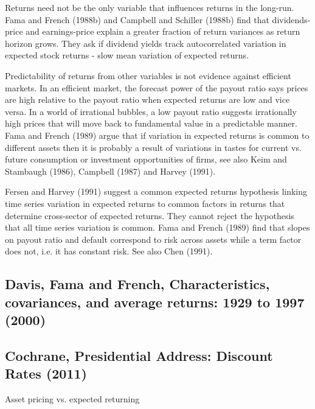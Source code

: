 Returns need not be the only variable that influences returns in the long-run. Fama and
French (1988b)\cite{fama1988dividend} and Campbell and Schiller
(1988b)\cite{campbell1988stock} find that dividends-price and earnings-price explain a
greater fraction of return variances as return horizon grows. They ask if dividend yields
track autocorrelated variation in expected stock returns - slow mean variation of expected
returns.

Predictability of returns from other variables is not evidence against efficient markets.
In an efficient market, the forecast power of the payout ratio says prices are high
relative to the payout ratio when expected returns are low and vice versa. In a world of
irrational bubbles, a low payout ratio suggests irrationally high prices that will move
back to fundamental value in a predictable manner. Fama and French
(1989)\cite{fama1989business} argue that if variation in expected returns is common to
different assets then it is probably a result of variations in tastes for current vs.
future consumption or investment opportunities of firms, see also Keim and Stambaugh
(1986)\cite{keim1986predicting}, Campbell (1987)\cite{campbell1987stock} and Harvey
(1991)\cite{harvey1991world}.

Fersen and Harvey (1991)\cite{ferson1991variation} suggest a common expected returns
hypothesis linking time series variation in expected returns to common factors in returns
that determine cross-sector of expected returns. They cannot reject the hypothesis that
all time series variation is common. Fama and French (1989)\cite{fama1989business} find
that slopes on payout ratio and default correspond to risk across assets while a term
factor does not, i.e. it has constant risk. See also Chen (1991)\cite{chen1991financial}.

\subsection[Davis, Fama and French, 2000]{Davis, Fama and French, Characteristics, covariances, and average returns: 1929 to 1997 (2000)\cite{davis2000characteristics}}

\subsection[Cochrane, 2011]{Cochrane, Presidential Address: Discount Rates (2011)}

Asset pricing vs. expected returning

